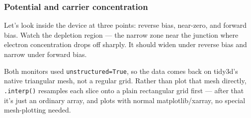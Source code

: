 \documentclass[11pt]{article}
\begin{document}
    \clearpage
    \subsubsection{Potential and carrier
concentration}\label{potential-and-carrier-concentration}

Let's look inside the device at three points: reverse bias, near-zero,
and forward bias. Watch the depletion region --- the narrow zone near
the junction where electron concentration drops off sharply. It should
widen under reverse bias and narrow under forward bias.

Both monitors used \texttt{unstructured=True}, so the data comes back on
tidy3d's native triangular mesh, not a regular grid. Rather than plot
that mesh directly, \texttt{.interp()} resamples each slice onto a plain
rectangular grid first --- after that it's just an ordinary array, and
plots with normal matplotlib/xarray, no special mesh-plotting needed.
\end{document}
